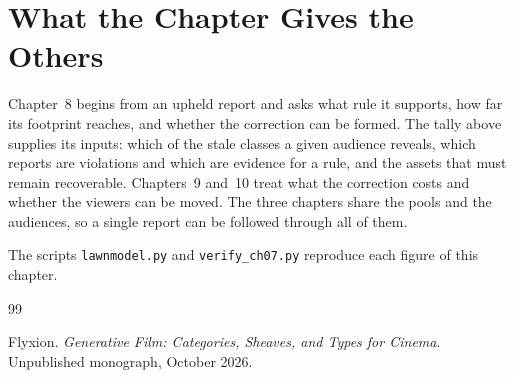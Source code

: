\documentclass[11pt,twoside,openright]{book}
\theoremstyle{plain}
\theoremstyle{definition}
\theoremstyle{remark}
\begin{document}
\section{What the Chapter Gives the Others}\label{sec:gives7}

Chapter~8 begins from an upheld report and asks what rule it supports, how far its footprint reaches, and whether the correction can be formed. The tally above supplies its inputs: which of the stale classes a given audience reveals, which reports are violations and which are evidence for a rule, and the assets that must remain recoverable. Chapters~9 and~10 treat what the correction costs and whether the viewers can be moved. The three chapters share the pools and the audiences, so a single report can be followed through all of them.

The scripts \texttt{lawnmodel.py} and \texttt{verify\_ch07.py} reproduce each figure of this chapter.

\begin{thebibliography}{99}

Flyxion.
\newblock \emph{Generative Film: Categories, Sheaves, and Types for Cinema}.
\newblock Unpublished monograph, October 2026.

\end{thebibliography}
\end{document}
